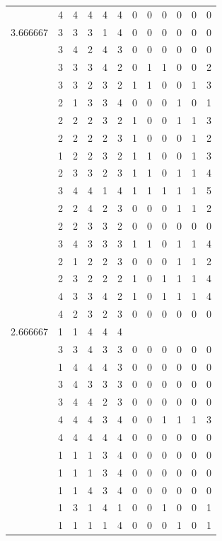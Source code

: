 \documentclass[]{book}
\theoremstyle{definition}
\theoremstyle{definition}
\theoremstyle{definition}
\theoremstyle{remark}
\begin{document}
\begin{table}
{\begin{tabular}[t]{rrrrrrrrrrrr}
 & 4 & 4 & 4 & 4 & 4 & 0 & 0 & 0 & 0 & 0 & 0\\
3.666667 & 3 & 3 & 3 & 1 & 4 & 0 & 0 & 0 & 0 & 0 & 0\\
 & 3 & 4 & 2 & 4 & 3 & 0 & 0 & 0 & 0 & 0 & 0\\
 & 3 & 3 & 3 & 4 & 2 & 0 & 1 & 1 & 0 & 0 & 2\\
 & 3 & 3 & 2 & 3 & 2 & 1 & 1 & 0 & 0 & 1 & 3\\
 & 2 & 1 & 3 & 3 & 4 & 0 & 0 & 0 & 1 & 0 & 1\\
 & 2 & 2 & 2 & 3 & 2 & 1 & 0 & 0 & 1 & 1 & 3\\
 & 2 & 2 & 2 & 2 & 3 & 1 & 0 & 0 & 0 & 1 & 2\\
 & 1 & 2 & 2 & 3 & 2 & 1 & 1 & 0 & 0 & 1 & 3\\
 & 2 & 3 & 3 & 2 & 3 & 1 & 1 & 0 & 1 & 1 & 4\\
 & 3 & 4 & 4 & 1 & 4 & 1 & 1 & 1 & 1 & 1 & 5\\
 & 2 & 2 & 4 & 2 & 3 & 0 & 0 & 0 & 1 & 1 & 2\\
 & 2 & 2 & 3 & 3 & 2 & 0 & 0 & 0 & 0 & 0 & 0\\
 & 3 & 4 & 3 & 3 & 3 & 1 & 1 & 0 & 1 & 1 & 4\\
 & 2 & 1 & 2 & 2 & 3 & 0 & 0 & 0 & 1 & 1 & 2\\
 & 2 & 3 & 2 & 2 & 2 & 1 & 0 & 1 & 1 & 1 & 4\\
 & 4 & 3 & 3 & 4 & 2 & 1 & 0 & 1 & 1 & 1 & 4\\
 & 4 & 2 & 3 & 2 & 3 & 0 & 0 & 0 & 0 & 0 & 0\\
2.666667 & 1 & 1 & 4 & 4 & 4 &  &  &  &  &  & \\
 & 3 & 3 & 4 & 3 & 3 & 0 & 0 & 0 & 0 & 0 & 0\\
 & 1 & 4 & 4 & 4 & 3 & 0 & 0 & 0 & 0 & 0 & 0\\
 & 3 & 4 & 3 & 3 & 3 & 0 & 0 & 0 & 0 & 0 & 0\\
 & 3 & 4 & 4 & 2 & 3 & 0 & 0 & 0 & 0 & 0 & 0\\
 & 4 & 4 & 4 & 3 & 4 & 0 & 0 & 1 & 1 & 1 & 3\\
 & 4 & 4 & 4 & 4 & 4 & 0 & 0 & 0 & 0 & 0 & 0\\
 & 1 & 1 & 1 & 3 & 4 & 0 & 0 & 0 & 0 & 0 & 0\\
 & 1 & 1 & 1 & 3 & 4 & 0 & 0 & 0 & 0 & 0 & 0\\
 & 1 & 1 & 4 & 3 & 4 & 0 & 0 & 0 & 0 & 0 & 0\\
 & 1 & 3 & 1 & 4 & 1 & 0 & 0 & 1 & 0 & 0 & 1\\
 & 1 & 1 & 1 & 1 & 4 & 0 & 0 & 0 & 1 & 0 & 1\\

\end{tabular}}
\end{table}
\end{document}
